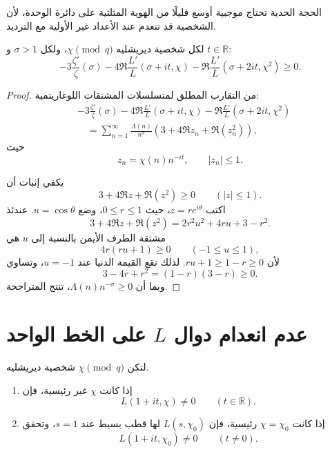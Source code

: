 الحجة الحدية تحتاج موجبية أوسع قليلًا من الهوية المثلثية على دائرة
الوحدة، لأن الشخصية قد تنعدم عند الأعداد غير الأولية مع الترديد.

\begin{lemma}
\label{lem:weighted-dirichlet-l-log-derivatives}
\provedhere
لكل شخصية ديريشليه \(\chi\pmod q\)، ولكل \(\sigma>1\) و
\(t\in\mathbb R\):
\[
-3\frac{\zeta'}{\zeta}(\sigma)
-4\Re\frac{L'}{L}(\sigma+it,\chi)
-\Re\frac{L'}{L}(\sigma+2it,\chi^2)
\ge0.
\]
\end{lemma}

\begin{proof}
من التقارب المطلق لمتسلسلات المشتقات اللوغاريتمية:
\begin{align*}
&-3\frac{\zeta'}{\zeta}(\sigma)
-4\Re\frac{L'}{L}(\sigma+it,\chi)
-\Re\frac{L'}{L}(\sigma+2it,\chi^2)\\
&\quad=
\sum_{n=1}^{\infty}\frac{\Lambda(n)}{n^\sigma}
\left(3+4\Re z_n+\Re(z_n^2)\right),
\end{align*}
حيث
\[
z_n=\chi(n)n^{-it},
\qquad |z_n|\le1.
\]

يكفي إثبات أن
\[
3+4\Re z+\Re(z^2)\ge0
\qquad(|z|\le1).
\]
اكتب \(z=re^{i\theta}\)، حيث \(0\le r\le1\)، وضع
\(u=\cos\theta\). عندئذ
\[
3+4\Re z+\Re(z^2)
=
2r^2u^2+4ru+3-r^2.
\]
مشتقة الطرف الأيمن بالنسبة إلى \(u\) هي
\[
4r(ru+1)\ge0
\qquad(-1\le u\le1),
\]
لأن \(ru+1\ge1-r\ge0\). لذلك تقع القيمة الدنيا عند \(u=-1\)،
وتساوي
\[
3-4r+r^2=(1-r)(3-r)\ge0.
\]
وبما أن \(\Lambda(n)n^{-\sigma}\ge0\)، تنتج المتراجحة.
\end{proof}

\section{عدم انعدام دوال \(L\) على الخط الواحد}

\begin{theorem}[عدم الانعدام على \(\Re(s)=1\)]
\label{thm:dirichlet-l-nonvanishing-on-one-line}
\provedhere
لتكن \(\chi\pmod q\) شخصية ديريشليه.
\begin{enumerate}
  \item إذا كانت \(\chi\) غير رئيسية، فإن
  \[
  L(1+it,\chi)\ne0
  \qquad(t\in\mathbb R).
  \]
  \item إذا كانت \(\chi=\chi_0\) رئيسية، فإن \(L(s,\chi_0)\) لها قطب
  بسيط عند \(s=1\)، وتحقق
  \[
  L(1+it,\chi_0)\ne0
  \qquad(t\ne0).
  \]
\end{enumerate}
\end{theorem}

